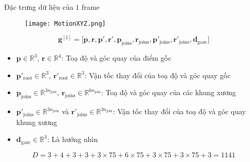 \begin{frame}{Đặc trưng dữ liệu của $1$ frame}
	\begin{figure}
		\centering
		\texttt{[image: MotionXYZ.png]}
	\end{figure}
	\begin{equation}
		\mathbf{g}^{[1]} = \Big[ \mathbf{p},  \mathbf{r},
		\mathbf{ p }',  \mathbf{r}',
		\mathbf{p}_{\text{joins}},  \mathbf{r}_{\text{joins}},
		\mathbf{p}'_{\text{joins}},  \mathbf{r}'_{\text{joins}},
		\mathbf{d}_{\text{gaze}}
		\Big]
	\end{equation}
	\vspace{-10pt}
	
	{\small
		\begin{itemize}
			\item $\mathbf{p} \in \mathbb{R}^3$, $\mathbf{r} \in \mathbb{R}^4$: Toạ độ và góc quay của điểm gốc
			\item $\mathbf{p}'_{\text{root}} \in \mathbb{R}^3$, $\mathbf{r}'_{\text{root}} \in \mathbb{R}^3$: Vận tốc thay đổi của toạ độ và góc quay gốc
			\item $\mathbf{p}_{\text{joins}} \in \mathbb{R}^{3 n_{\text{join} }}$, $\mathbf{r}_{\text{joins}} \in \mathbb{R}^{6 n_{\text{join} }}$: Toạ độ và góc quay của các khung xương
			\item $\mathbf{p}'_{\text{joins}} \in \mathbb{R}^{3n_{\text{join} }}$ và $\mathbf{r}'_{\text{joins}} \in \mathbb{R}^{3n_{\text{join} }}$: Vận tốc thay đổi của toạ độ và góc quay khung xương
			\item $\mathbf{d}_{\text{gaze}} \in \mathbb{R}^3$: Là hướng nhìn
	\end{itemize}}
	\vspace{-10pt}
	{\small
		\begin{equation*}
			D = 3 + 4 + 3 + 3 + 3 \times 75 + 6 \times 75 + 3 \times 75 + 3 \times 75 + 3 = 1141
	\end{equation*}}
			
			
	
\end{frame}

